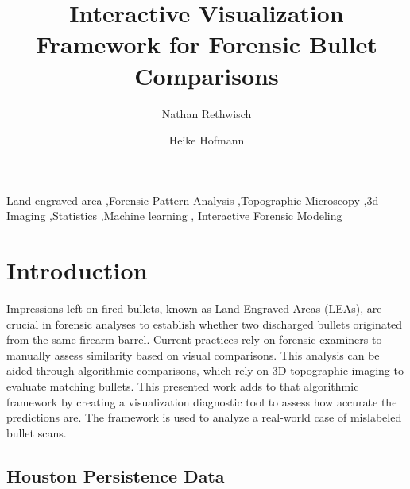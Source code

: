 \documentclass[
  number]{elsarticle}
\begin{document}
\begin{frontmatter}
\title{Interactive Visualization Framework for Forensic Bullet
Comparisons}
\author[1]{Nathan Rethwisch%
%
}
\author[1]{Heike Hofmann%
%
}




        





\begin{keyword}
    Land engraved area \sep Forensic Pattern Analysis \sep Topographic
Microscopy \sep 3d Imaging \sep Statistics \sep Machine learning \sep 
    Interactive Forensic Modeling
\end{keyword}
\end{frontmatter}
    \ifdefined\Shaded\renewenvironment{Shaded}{\begin{tcolorbox}[borderline west={3pt}{0pt}{shadecolor}, boxrule=0pt, sharp corners, breakable, interior hidden, enhanced, frame hidden]}{\end{tcolorbox}}\fi

\makeatletter
\def\ps@pprintTitle{%
  \let\@oddhead\@empty
  \let\@evenhead\@empty
  \def\@oddfoot{\reset@font\hfil\thepage\hfil}
  \let\@evenfoot\@oddfoot
}
\makeatother

\hypertarget{introduction}{%
\section{Introduction}\label{introduction}}

Impressions left on fired bullets, known as Land Engraved Areas (LEAs),
are crucial in forensic analyses to establish whether two discharged
bullets originated from the same firearm barrel. Current practices rely
on forensic examiners to manually assess similarity based on visual
comparisons. This analysis can be aided through algorithmic comparisons,
which rely on 3D topographic imaging to evaluate matching bullets. This
presented work adds to that algorithmic framework by creating a
visualization diagnostic tool to assess how accurate the predictions
are. The framework is used to analyze a real-world case of mislabeled
bullet scans.

\hypertarget{houston-persistence-data}{%
\subsection{Houston Persistence Data}\label{houston-persistence-data}}
\end{document}
